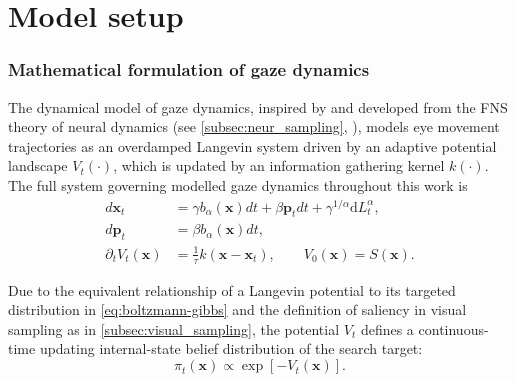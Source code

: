 \section{Model setup}\label{sec:model_setup}
\subsubsection*{Mathematical formulation of gaze dynamics}
The dynamical model of gaze dynamics, inspired by and developed from the FNS theory of neural dynamics (see \cref{subsec:neur_sampling}, \cite{qi_fractional_2022}), models eye movement trajectories as an overdamped Langevin system driven by an adaptive potential landscape $V_t(\cdot)$, which is updated by an information gathering kernel $k(\cdot)$. The full system governing modelled gaze dynamics throughout this work is
\begin{equation}\label{eq:fns_system}
	\begin{aligned}
		d\mathbf{x}_t &= \gamma b_{\alpha}(\mathbf{x})dt + \beta \mathbf{p}_t dt + \gamma^{1/\alpha} \mathrm{d}L_t^{\alpha},\\
		d\mathbf{p}_t &= \beta b_{\alpha}(\mathbf{x}) dt,\\
		\partial_t V_{t}(\mathbf{x}) &= \frac{1}{\tau}k(\mathbf{x} - \mathbf{x}_t), 
		\qquad V_0(\mathbf{x}) = S(\mathbf{x}).
	\end{aligned}
\end{equation}

Due to the equivalent relationship of a Langevin potential to its targeted distribution in \cref{eq:boltzmann-gibbs} and the definition of saliency in visual sampling as in \cref{subsec:visual_sampling}, the potential $V_t$ defines a continuous-time updating internal-state belief distribution of the search target:
\begin{equation}\label{eq:pi_t_V_t_equation}
	\pi_t(\mathbf{x}) \propto \exp \left[ -V_t(\mathbf{x}) \right].
\end{equation}

